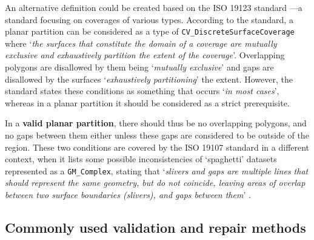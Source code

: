 An alternative definition could be created based on the ISO 19123 standard \citep[\S{}6.8]{ISO19123:2007}---a standard focusing on coverages of various types.
According to the standard, a planar partition can be considered as a type of \texttt{CV\_DiscreteSurfaceCoverage} where `\emph{the surfaces that constitute the domain of a coverage are mutually exclusive and exhaustively partition the extent of the coverage}'.
Overlapping polygons are disallowed by them being `\emph{mutually exclusive}' and gaps are disallowed by the surfaces `\emph{exhaustively partitioning}' the extent.
However, the standard states these conditions as something that occurs `\emph{in most cases}', whereas in a planar partition it should be considered as a strict prerequisite.

In a \textbf{valid planar partition}, there should thus be no overlapping polygons, and no gaps between them either unless these gaps are considered to be outside of the region.
These two conditions are covered by the ISO 19107 standard in a different context, when it lists some possible inconsistencies of `spaghetti' datasets represented as a \texttt{GM\_Complex}, stating that `\emph{slivers and gaps are multiple lines that should represent the same geometry, but do not coincide, leaving areas of overlap between two surface boundaries (slivers), and gaps between them}' \citep[\S{}6.2.2.6]{ISO19107:2005}.

\subsection{Commonly used validation and repair methods}

